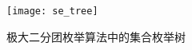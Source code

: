 
\begin{figure} [ht]
  \centering
  \vspace{0.3 in}
  \texttt{[image: se\_tree]}
  \vspace{0.2 in}
  \caption{极大二分团枚举算法中的集合枚举树}
  \label{fig:se}
\end{figure}

